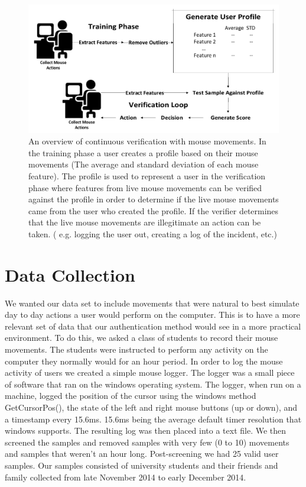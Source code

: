 \documentclass[conference]{IEEEtran}
\begin{document}
\begin{figure}[h!]
  \includegraphics[width=1\linewidth]{Overview.pdf}
\caption{An overview of continuous verification with mouse movements. In the training phase a user creates a profile based on their mouse movements (The average and standard deviation of each mouse feature). The profile is used to represent a user in the verification phase where features from live mouse movements can be verified against the profile in order to determine if the live mouse movements came from the user who created the profile. If the verifier determines that the live mouse movements are illegitimate an action can be taken. ( e.g. logging the user out, creating a log of the incident, etc.)}
\end{figure}


\section{Data Collection}
We wanted our data set to include movements that were natural to best simulate day to day actions a user would perform on the computer. This is to have a more relevant set of data that our authentication method would see in a more practical environment. To do this, we asked a class of students to record their mouse movements. The students were instructed to perform any activity on the computer they normally would for an hour period.
	In order to log the mouse activity of users we created a simple mouse logger.  The logger was a small piece of software that ran on the windows operating system. The logger, when run on a machine, logged the position of the cursor using the windows method GetCursorPos(), the state of the left and right mouse buttons (up or down), and a timestamp every 15.6ms. 15.6ms being the average default timer resolution that windows supports. The resulting log was then placed into a text file. 
We then screened the samples and removed samples with very few (0 to 10) movements and samples that weren't an hour long. Post-screening we had 25 valid user samples.  Our samples consisted of university students and their friends and family collected from late November 2014 to early December 2014.
\end{document}
